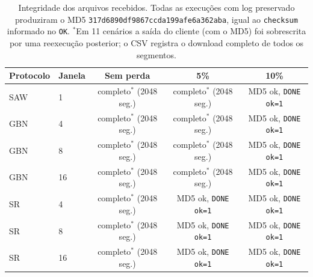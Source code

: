 \begin{table}[H]
\centering
\footnotesize
\begin{tabular}{llccc}
\toprule
Protocolo & Janela & Sem perda & 5\% & 10\% \\
\midrule
SAW & 1 & completo$^*$ (2048 seg.) & completo$^*$ (2048 seg.) & MD5 ok, \texttt{DONE ok=1} \\
GBN & 4 & completo$^*$ (2048 seg.) & completo$^*$ (2048 seg.) & MD5 ok, \texttt{DONE ok=1} \\
GBN & 8 & completo$^*$ (2048 seg.) & completo$^*$ (2048 seg.) & MD5 ok, \texttt{DONE ok=1} \\
GBN & 16 & completo$^*$ (2048 seg.) & completo$^*$ (2048 seg.) & MD5 ok, \texttt{DONE ok=1} \\
SR & 4 & completo$^*$ (2048 seg.) & MD5 ok, \texttt{DONE ok=1} & MD5 ok, \texttt{DONE ok=1} \\
SR & 8 & completo$^*$ (2048 seg.) & MD5 ok, \texttt{DONE ok=1} & MD5 ok, \texttt{DONE ok=1} \\
SR & 16 & completo$^*$ (2048 seg.) & MD5 ok, \texttt{DONE ok=1} & MD5 ok, \texttt{DONE ok=1} \\
\bottomrule
\end{tabular}
\caption{Integridade dos arquivos recebidos. Todas as execuções com log preservado produziram o MD5 \texttt{317d6890df9867ccda199afe6a362aba}, igual ao \texttt{checksum} informado no \texttt{OK}. $^*$Em 11 cenários a saída do cliente (com o MD5) foi sobrescrita por uma reexecução posterior; o CSV registra o download completo de todos os segmentos.}
\label{tab:md5}
\end{table}
